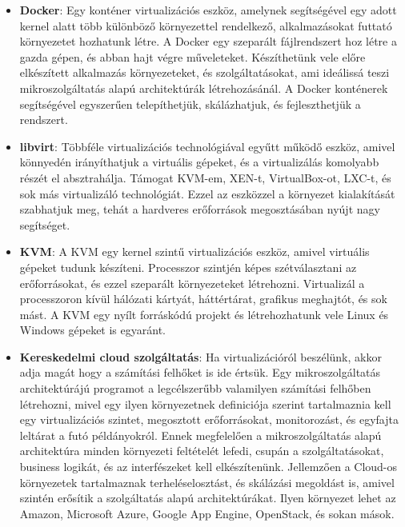 \documentclass[11pt,magyar,a4paper,twoside,]{report}
\begin{document}
\begin{itemize}
\item
  \textbf{Docker}\citep{docker}: Egy konténer virtualizációs eszköz,
  amelynek segítségével egy adott kernel alatt több különböző
  környezettel rendelkező, alkalmazásokat futtató környezetet hozhatunk
  létre. A Docker egy szeparált fájlrendszert hoz létre a gazda gépen,
  és abban hajt végre műveleteket. Készíthetünk vele előre elkészített
  alkalmazás környezeteket, és szolgáltatásokat, ami ideálissá teszi
  mikroszolgáltatás alapú architektúrák létrehozásánál. A Docker
  konténerek segítségével egyszerűen telepíthetjük, skálázhatjuk, és
  fejleszthetjük a rendszert.
\item
  \textbf{libvirt}\citep{libvirt}: Többféle virtualizációs
  technológiával egyűtt működő eszköz, amivel könnyedén irányíthatjuk a
  virtuális gépeket, és a virtualizálás komolyabb részét el
  absztrahálja. Támogat KVM-em, XEN-t, VirtualBox-ot, LXC-t, és sok más
  virtualizáló technológiát. Ezzel az eszközzel a környezet kialakítását
  szabhatjuk meg, tehát a hardveres erőforrások megosztásában nyújt nagy
  segítséget.
\item
  \textbf{KVM}\citep{kvm}: A KVM egy kernel szintű virtualizációs
  eszköz, amivel virtuális gépeket tudunk készíteni. Processzor szintjén
  képes szétválasztani az erőforrásokat, és ezzel szeparált
  környezeteket létrehozni. Virtualizál a processzoron kívül hálózati
  kártyát, háttértárat, grafikus meghajtót, és sok mást. A KVM egy nyílt
  forráskódú projekt és létrehozhatunk vele Linux és Windows gépeket is
  egyaránt.
\item
  \textbf{Kereskedelmi cloud szolgáltatás}: Ha virtualizációról
  beszélünk, akkor adja magát hogy a számítási felhőket is ide értsük.
  Egy mikroszolgáltatás architektúrájú programot a legcélszerűbb
  valamilyen számítási felhőben létrehozni, mivel egy ilyen környezetnek
  definiciója szerint tartalmaznia kell egy virtualizációs szintet,
  megosztott erőforrásokat, monitorozást, és egyfajta leltárat a futó
  példányokról. Ennek megfelelően a mikroszolgáltatás alapú architektúra
  minden környezeti feltételét lefedi, csupán a szolgáltatásokat,
  business logikát, és az interfészeket kell elkészítenünk. Jellemzően a
  Cloud-os környezetek tartalmaznak terheléselosztást, és skálázási
  megoldást is, amivel szintén erősítik a szolgáltatás alapú
  architektúrákat. Ilyen környezet lehet az Amazon, Microsoft Azure,
  Google App Engine, OpenStack, és sokan mások.
\end{itemize}
\end{document}
